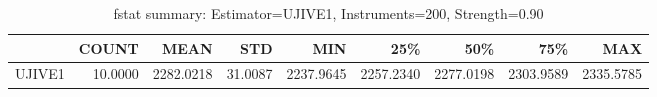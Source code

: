 \begin{table}[ht]
\centering
\caption{fstat summary: Estimator=UJIVE1, Instruments=200, Strength=0.90}
\begin{tabular}{lrrrrrrrr}
\toprule
 & COUNT & MEAN & STD & MIN & 25\% & 50\% & 75\% & MAX \\
\midrule
UJIVE1 & 10.0000 & 2282.0218 & 31.0087 & 2237.9645 & 2257.2340 & 2277.0198 & 2303.9589 & 2335.5785 \\
\bottomrule
\end{tabular}
\end{table}
